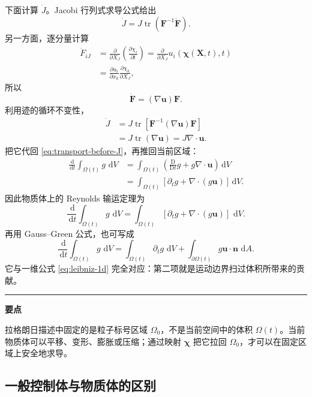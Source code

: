 \documentclass[cn,hazy,blue,11pt,normal]{elegantnote}
\numberwithin{equation}{section}
\newcommand{\dd}{\,\mathrm d}
\newcommand{\Dt}{\frac{\mathrm D}{\mathrm Dt}}
\newcommand{\vct}[1]{\bm{#1}}
\newcommand{\ten}[1]{\bm{#1}}
\newcommand{\tr}{\operatorname{tr}}
\newenvironment{keypoint}{%
  \par\medskip\noindent\color{blue!60!black}\rule{0.8em}{0.8em}\quad
  \begin{minipage}{0.91\linewidth}\color{black}\textbf{要点}\quad
}{\end{minipage}\par\medskip}
\begin{document}
下面计算 $\dot J$。Jacobi 行列式求导公式给出
\begin{equation}
 \dot J=J\tr(\ten F^{-1}\dot{\ten F}).
\end{equation}
另一方面，逐分量计算
\begin{align}
 \dot F_{iJ}
 &=\frac{\partial}{\partial X_J}\left(\frac{\partial\chi_i}{\partial t}\right)
 =\frac{\partial}{\partial X_J}u_i(\vct\chi(\vct X,t),t)\\
 &=\frac{\partial u_i}{\partial x_k}\frac{\partial\chi_k}{\partial X_J},
\end{align}
所以
\begin{equation}
 \dot{\ten F}=(\nabla\vct u)\ten F.
\end{equation}
利用迹的循环不变性，
\begin{align}
 \dot J
 &=J\tr[\ten F^{-1}(\nabla\vct u)\ten F]\\
 &=J\tr(\nabla\vct u)
 =J\nabla\cdot\vct u. \label{eq:Jdot-detailed}
\end{align}
把它代回 \eqref{eq:transport-before-J}，再推回当前区域：
\begin{align}
 \frac{\dd}{\dd t}\int_{\Omega(t)}g\,\dd V
 &=\int_{\Omega(t)}
 \left(\Dt g+g\nabla\cdot\vct u\right)\dd V\\
 &=\int_{\Omega(t)}
 \left[\partial_tg+\nabla\cdot(g\vct u)\right]\dd V. \label{eq:RTT-detailed}
\end{align}
因此物质体上的 Reynolds 输运定理为
\begin{equation}
 \boxed{\frac{\dd}{\dd t}\int_{\Omega(t)}g\,\dd V
 =\int_{\Omega(t)}[\partial_tg+\nabla\cdot(g\vct u)]\,\dd V.} \label{eq:RTT-boxed}
\end{equation}
再用 Gauss--Green 公式，也可写成
\begin{equation}
 \boxed{\frac{\dd}{\dd t}\int_{\Omega(t)}g\,\dd V
 =\int_{\Omega(t)}\partial_tg\,\dd V
 +\int_{\partial\Omega(t)}g\vct u\cdot\vct n\,\dd A.} \label{eq:RTT-boundary}
\end{equation}
它与一维公式 \eqref{eq:leibniz-1d} 完全对应：第二项就是运动边界扫过体积所带来的贡献。

\begin{keypoint}
拉格朗日描述中固定的是粒子标号区域 $\Omega_0$，不是当前空间中的体积 $\Omega(t)$。当前物质体可以平移、变形、膨胀或压缩；通过映射 $\vct\chi$ 把它拉回 $\Omega_0$，才可以在固定区域上安全地求导。
\end{keypoint}

\subsection{一般控制体与物质体的区别}
\end{document}
